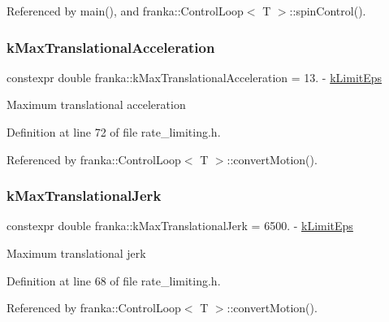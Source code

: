 Referenced by main(), and franka\+::\+Control\+Loop$<$ T $>$\+::spin\+Control().

\mbox{\label{namespacefranka_a3803b1a54ba526ccaa4fa0d15446f3db}} 
\subsubsection{\texorpdfstring{k\+Max\+Translational\+Acceleration}{kMaxTranslationalAcceleration}}
{\footnotesize\ttfamily constexpr double franka\+::k\+Max\+Translational\+Acceleration = 13. -\/ \hyperlink{namespacefranka_aad1f9b575274830b8da9e638559d424b}{k\+Limit\+Eps}}

Maximum translational acceleration 

Definition at line 72 of file rate\+\_\+limiting.\+h.



Referenced by franka\+::\+Control\+Loop$<$ T $>$\+::convert\+Motion().

\mbox{\label{namespacefranka_a46b8f11959ed3f731a0914f524af8e69}} 
\subsubsection{\texorpdfstring{k\+Max\+Translational\+Jerk}{kMaxTranslationalJerk}}
{\footnotesize\ttfamily constexpr double franka\+::k\+Max\+Translational\+Jerk = 6500. -\/ \hyperlink{namespacefranka_aad1f9b575274830b8da9e638559d424b}{k\+Limit\+Eps}}

Maximum translational jerk 

Definition at line 68 of file rate\+\_\+limiting.\+h.



Referenced by franka\+::\+Control\+Loop$<$ T $>$\+::convert\+Motion().

\mbox{\label{namespacefranka_a857e1e5e18d688ec7095264a629bf474}} 
